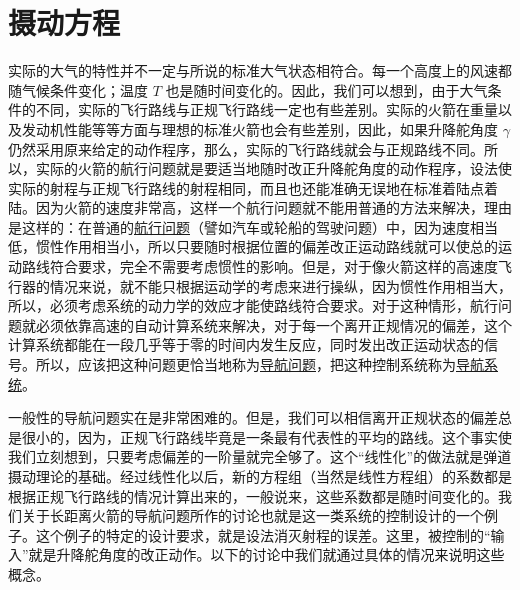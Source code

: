 \section{摄动方程}

实际的大气的特性并不一定与所说的标准大气状态相符合。每一个高度上的风速都随气候条件变化；温度 $T$ 也是随时间变化的。因此，我们可以想到，由于大气条件的不同，实际的飞行路线与正规飞行路线一定也有些差别。实际的火箭在重量以及发动机性能等等方面与理想的标准火箭也会有些差别，因此，如果升降舵角度 $\gamma$ 仍然采用原来给定的动作程序，那么，实际的飞行路线就会与正规路线不同。所以，实际的火箭的航行问题就是要适当地随时改正升降舵角度的动作程序，设法使实际的射程与正规飞行路线的射程相同，而且也还能准确无误地在标准着陆点着陆。因为火箭的速度非常高，这样一个航行问题就不能用普通的方法来解决，理由是这样的：在普通的\underline{航行问题}（譬如汽车或轮船的驾驶问题）中，因为速度相当低，惯性作用相当小，所以只要随时根据位置的偏差改正运动路线就可以使总的运动路线符合要求，完全不需要考虑惯性的影响。但是，对于像火箭这样的高速度飞行器的情况来说，就不能只根据运动学的考虑来进行操纵，因为惯性作用相当大，所以，必须考虑系统的动力学的效应才能使路线符合要求。对于这种情形，航行问题就必须依靠高速的自动计算系统来解决，对于每一个离开正规情况的偏差，这个计算系统都能在一段几乎等于零的时间内发生反应，同时发出改正运动状态的信号。所以，应该把这种问题更恰当地称为\underline{导航问题}，把这种控制系统称为\underline{导航系统}。

一般性的导航问题实在是非常困难的。但是，我们可以相信离开正规状态的偏差总是很小的，因为，正规飞行路线毕竟是一条最有代表性的平均的路线。这个事实使我们立刻想到，只要考虑偏差的一阶量就完全够了。这个“线性化”的做法就是弹道摄动理论的基础。经过线性化以后，新的方程组（当然是线性方程组）的系数都是根据正规飞行路线的情况计算出来的，一般说来，这些系数都是随时间变化的。我们关于长距离火箭的导航问题所作的讨论也就是这一类系统的控制设计的一个例子。这个例子的特定的设计要求，就是设法消灭射程的误差。这里，被控制的“输入”就是升降舵角度的改正动作。以下的讨论中我们就通过具体的情况来说明这些概念。


